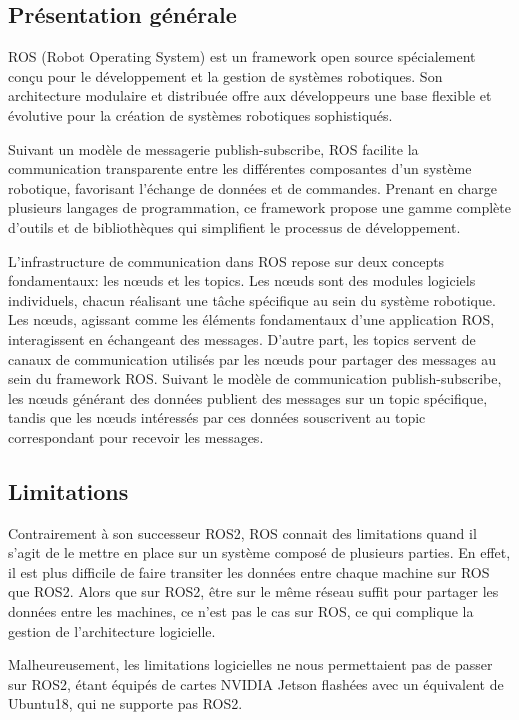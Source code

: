 \documentclass[12pt]{report}
\begin{document}
\subsection{Présentation générale}
ROS (Robot Operating System) est un framework open source spécialement conçu pour le développement 
et la gestion de systèmes robotiques. Son architecture modulaire et distribuée offre aux développeurs
une base flexible et évolutive pour la création de systèmes robotiques sophistiqués.

Suivant un modèle de messagerie publish-subscribe, ROS facilite la communication transparente
entre les différentes composantes d'un système robotique, favorisant l'échange de données et de
commandes. Prenant en charge plusieurs langages de programmation, ce framework propose une
gamme complète d'outils et de bibliothèques qui simplifient le processus de développement.

L'infrastructure de communication dans ROS repose sur deux concepts fondamentaux: les nœuds
et les topics. Les nœuds sont des modules logiciels individuels, chacun réalisant une tâche spécifique
au sein du système robotique. Les nœuds, agissant comme les éléments fondamentaux d'une application ROS,
interagissent en échangeant des messages. D'autre part, les topics servent de canaux de communication
utilisés par les nœuds pour partager des messages au sein du framework ROS. Suivant
le modèle de communication publish-subscribe, les nœuds générant des données publient des messages sur
un topic spécifique, tandis que les nœuds intéressés par ces données souscrivent au topic correspondant
pour recevoir les messages.

\subsection{Limitations}

Contrairement à son successeur ROS2, ROS connait des limitations quand il s'agit de le mettre en place
sur un système composé de plusieurs parties. En effet, il est plus difficile de faire transiter les données
entre chaque machine sur ROS que ROS2. Alors que sur ROS2, être sur le même réseau suffit pour partager
les données entre les machines, ce n'est pas le cas sur ROS, ce qui complique la gestion de l'architecture
logicielle.

Malheureusement, les limitations logicielles ne nous permettaient pas de passer sur ROS2, étant équipés de
cartes NVIDIA Jetson flashées avec un équivalent de Ubuntu18, qui ne supporte pas ROS2.
\end{document}
